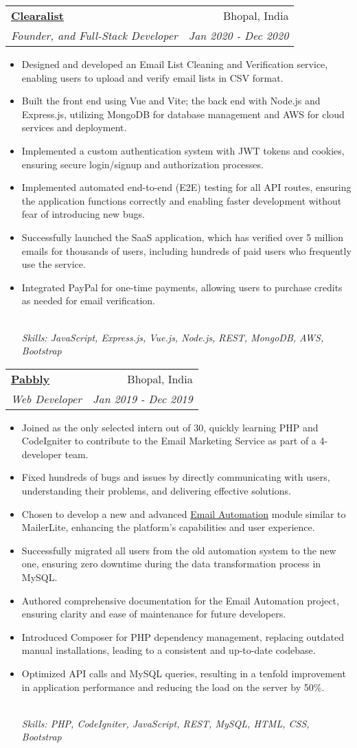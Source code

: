\documentclass[letterpaper,12pt]{article}
\makeatletter
\newcommand{\resumeItem}[1]{
  \item\small{#1}\vspace{-2pt}
}
\newcommand{\resumeSubheading}[4]{
  \vspace{-2pt}\item
    \begin{tabular*}{1\textwidth}[t]{l@{\extracolsep{\fill}}r}
      \textbf{#1} & \small{#2} \\
      \emph{\small{#3}} & \emph{\small{#4}} \\
    \end{tabular*}\vspace{-5pt}
}
\newcommand{\resumeItemFooter}[1]{
    \\ \vspace{7pt}\hspace{-0.35in}\footnotesize\emph{#1}
}
\newcommand{\resumeItemListStart}{\begin{itemize}}
\newcommand{\resumeItemListEnd}{\end{itemize}\vspace{-5pt}}
\def\myHometown{Bhopal, India}
\def\clearalistLink{https://clearalist.com}
\def\pabblyLink{https://pabbly.com/email-marketing}
\def\emailAutomationLink{https://youtube.com/watch?v=kkopsVYOO7Y}
\makeatother
\begin{document}
\resumeSubheading
{\href{\clearalistLink}{\color{blue}Clearalist}}{\myHometown}
{Founder, and Full-Stack Developer}{Jan 2020 - Dec 2020}
\resumeItemListStart
\resumeItem{Designed and developed an Email List Cleaning and Verification service, enabling users to upload and verify email lists in CSV format.}
\resumeItem{Built the front end using Vue and Vite; the back end with Node.js and Express.js, utilizing MongoDB for database management and AWS for cloud services and deployment.}
\resumeItem{Implemented a custom authentication system with JWT tokens and cookies, ensuring secure login/signup and authorization processes.}
\resumeItem{Implemented automated end-to-end (E2E) testing for all API routes, ensuring the application functions correctly and enabling faster development without fear of introducing new bugs.}
\resumeItem{Successfully launched the SaaS application, which has verified over 5 million emails for thousands of users, including hundreds of paid users who frequently use the service.}
\resumeItem{Integrated PayPal for one-time payments, allowing users to purchase credits as needed for email verification.}
\resumeItemFooter{Skills: JavaScript, Express.js, Vue.js, Node.js, REST, MongoDB, AWS, Bootstrap}
\resumeItemListEnd

\resumeSubheading
{\href{\pabblyLink}{\color{blue}Pabbly}}{\myHometown}
{Web Developer}{Jan 2019 - Dec 2019}
\resumeItemListStart
\resumeItem{Joined as the only selected intern out of 30, quickly learning PHP and CodeIgniter to contribute to the Email Marketing Service as part of a 4-developer team.}
\resumeItem{Fixed hundreds of bugs and issues by directly communicating with users, understanding their problems, and delivering effective solutions.}
\resumeItem{Chosen to develop a new and advanced \href{\emailAutomationLink}{\color{blue}Email Automation} module similar to MailerLite, enhancing the platform's capabilities and user experience.}
\resumeItem{Successfully migrated all users from the old automation system to the new one, ensuring zero downtime during the data transformation process in MySQL.}
\resumeItem{Authored comprehensive documentation for the Email Automation project, ensuring clarity and ease of maintenance for future developers.}
\resumeItem{Introduced Composer for PHP dependency management, replacing outdated manual installations, leading to a consistent and up-to-date codebase.}
\resumeItem{Optimized API calls and MySQL queries, resulting in a tenfold improvement in application performance and reducing the load on the server by 50\%.}
\resumeItemFooter{Skills: PHP, CodeIgniter, JavaScript, REST, MySQL, HTML, CSS, Bootstrap}
\resumeItemListEnd
\end{document}
